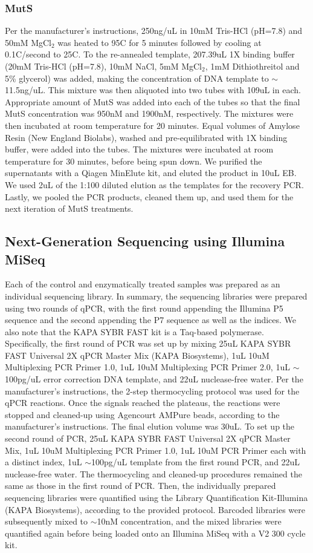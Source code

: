 \documentclass[twocolumn]{article}
\begin{document}
\subsubsection*{MutS}
Per the manufacturer’s instructions, 250ng/uL in 10mM Tris-HCl (pH=7.8) and 50mM MgCl$_2$ was heated to 95C for 5 minutes followed by cooling at 0.1C/second to 25C. To the re-annealed template, 207.39uL 1X binding buffer (20mM Tris-HCl (pH=7.8), 10mM NaCl, 5mM MgCl$_2$, 1mM Dithiothreitol and 5\% glycerol) was added, making the concentration of DNA template to $\sim$11.5ng/uL. This mixture was then aliquoted into two tubes with 109uL in each. Appropriate amount of MutS was added into each of the tubes so that the final MutS concentration was 950nM and 1900nM, respectively. The mixtures were then incubated at room temperature for 20 minutes. Equal volumes of Amylose Resin (New England Biolabs), washed and pre-equilibrated with 1X binding buffer, were added into the tubes. The mixtures were incubated at room temperature for 30 minutes, before being spun down. We purified the supernatants with a Qiagen MinElute kit, and eluted the product in 10uL EB. We used 2uL of the 1:100 diluted elution as the templates for the recovery PCR. Lastly, we pooled the PCR products, cleaned them up, and used them for the next iteration of MutS treatments.

\subsection*{Next-Generation Sequencing using Illumina MiSeq}
Each of the control and enzymatically treated samples was prepared as an individual sequencing library. In summary, the sequencing libraries were prepared using two rounds of qPCR, with the first round appending the Illumina P5 sequence and the second appending the P7 sequence as well as the indices. We also note that the KAPA SYBR FAST kit is a Taq-based polymerase. Specifically, the first round of PCR was set up by mixing 25uL KAPA SYBR FAST Universal 2X qPCR Master Mix (KAPA Biosystems), 1uL 10uM Multiplexing PCR Primer 1.0, 1uL 10uM Multiplexing PCR Primer 2.0, 1uL $\sim$100pg/uL error correction DNA template, and 22uL nuclease-free water. Per the manufacturer’s instructions, the 2-step thermocycling protocol was used for the qPCR reactions. Once the signals reached the plateaus, the reactions were stopped and cleaned-up using Agencourt AMPure beads, according to the manufacturer’s instructions. The final elution volume was 30uL. To set up the second round of PCR, 25uL KAPA SYBR FAST Universal 2X qPCR Master Mix, 1uL 10uM Multiplexing PCR Primer 1.0, 1uL 10uM PCR Primer each with a distinct index, 1uL $\sim$100pg/uL template from the first round PCR, and 22uL nuclease-free water. The thermocycling and cleaned-up procedures remained the same as those in the first round of PCR. Then, the individually prepared sequencing libraries were quantified using the Library Quantification Kit-Illumina (KAPA Biosystems), according to the provided protocol. Barcoded libraries were subsequently mixed to $\sim$10nM concentration, and the mixed libraries were quantified again before being loaded onto an Illumina MiSeq with a V2 300 cycle kit.
\end{document}
